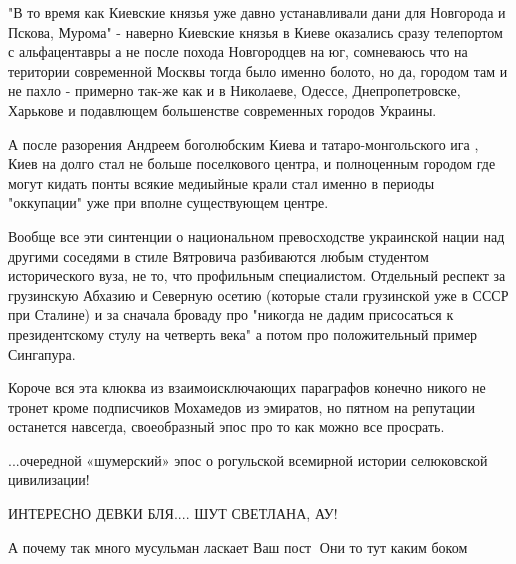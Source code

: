 \begin{itemize}
"В то время как Киевские князья уже давно устанавливали дани для Новгорода и
Пскова, Мурома" - наверно Киевские князья в Киеве оказались сразу телепортом с
альфацентавры а не после похода Новгородцев на юг, сомневаюсь что на територии
современной Москвы тогда было именно болото, но да, городом там и не пахло -
примерно так-же как и в Николаеве, Одессе, Днепропетровске, Харькове и
подавлющем большенстве современных городов Украины. 

А после разорения Андреем
боголюбским Киева и татаро-монгольского ига , Киев на долго стал не больше
поселкового центра, и полноценным городом где могут кидать понты всякие
медиыйные крали стал именно в периоды "оккупации" уже при вполне существующем
центре. 

Вообще все эти синтенции о национальном превосходстве украинской нации
над другими соседями в стиле Вятровича разбиваются любым студентом
исторического вуза, не то, что профильным специалистом. Отдельный респект за
грузинскую Абхазию и Северную осетию (которые стали грузинской уже в СССР при
Сталине) и за сначала броваду про "никогда не дадим присосаться к
президентскому стулу на четверть века" а потом про положительный пример
Сингапура. 

Короче вся эта клюква из взаимоисключающих параграфов конечно никого
не тронет кроме подписчиков Мохамедов из эмиратов, но пятном на репутации
останется навсегда, своеобразный эпос про то как можно все просрать.


 
...очередной «шумерский» эпос о рогульской всемирной истории селюковской цивилизации!

 
ИНТЕРЕСНО ДЕВКИ БЛЯ.... ШУТ
СВЕТЛАНА, АУ!

 
А почему так много мусульман ласкает Ваш пост 🤔Они то тут каким боком 🤔


\end{itemize}
